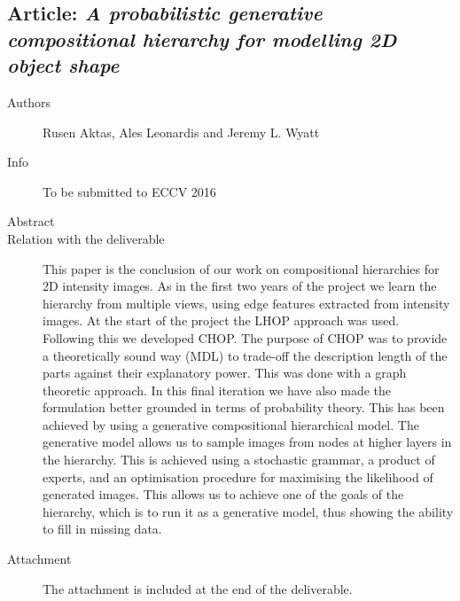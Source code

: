 \documentclass[a4paper,11pt,pdf]{../templates/pacmanreport}
\begin{document}
\subsection{Article: \em A probabilistic generative compositional hierarchy for modelling 2D object shape}
\begin{description}
    \item[Authors] Rusen Aktas, Ales Leonardis and Jeremy L. Wyatt
    \item[Info] To be submitted to ECCV 2016 %
    \item[Abstract] 
    \item [Relation with the deliverable] This paper is the conclusion of our work on compositional hierarchies for 2D intensity images. As in the first two years of the project we learn the hierarchy from multiple views, using edge features extracted from intensity images. At the start of the project the LHOP approach was used. Following this we developed CHOP. The purpose of CHOP was to provide a theoretically sound way (MDL) to trade-off the description length of the parts against their explanatory power. This was done with a graph theoretic approach. In this final iteration we have also made the formulation better grounded in terms of probability theory. This has been achieved by using a generative compositional hierarchical model. The generative model allows us to sample images from nodes at higher layers in the hierarchy. This is achieved using a stochastic grammar, a product of experts, and an optimisation procedure for maximising the likelihood of generated images. This allows us to achieve one of the goals of the hierarchy, which is to run it as a generative model, thus showing the ability to fill in missing data.
    
    \item[Attachment] The attachment is included at the end of the deliverable. %
\end{description}
\newpage
\end{document}
